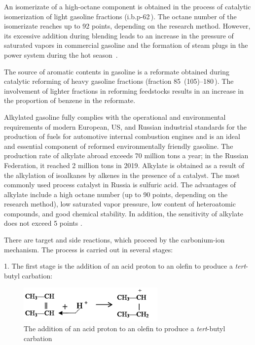 \documentclass{svproc}
\begin{document}
An isomerizate of a high-octane component is obtained in the process of catalytic isomerization of light gasoline fractions (i.b.p-62\,\textcelsius). The octane number of the isomerizate reaches up to 92 points, depending on the research method. However, its excessive addition during blending leads to an increase in the pressure of saturated vapors in commercial gasoline and the formation of steam plugs in the power system during the hot season~\cite{alkylation_mod}.

The source of aromatic contents in gasoline is a reformate obtained during catalytic reforming of heavy gasoline fractions (fraction 85~(105)--180\,\textcelsius). The involvement of lighter fractions in reforming feedstocks results in an increase in the proportion of benzene in the reformate.

Alkylated gasoline fully complies with the operational and environmental requirements of modern European, US, and Russian industrial standards for the production of fuels for automotive internal combustion engines and is an ideal and essential component of reformed environmentally friendly gasoline. The production rate of alkylate abroad exceeds 70 million tons a year; in the Russian Federation, it reached 2 million tons in 2019. Alkylate is obtained as a result of the alkylation of isoalkanes by alkenes in the presence of a catalyst. The most commonly used process catalyst in Russia is sulfuric acid. The advantages of alkylate include a high octane number (up to 90 points, depending on the research method), low saturated vapor pressure, low content of heteroatomic compounds, and good chemical stability. In addition, the sensitivity of alkylate does not exceed 5 points \cite{cao2019}.

There are target and side reactions, which proceed by the carbonium-ion mechanism. The process is carried out in several stages:

1. The first stage is the addition of an acid proton to an olefin to produce a \emph{tert}-butyl carbation:
\begin{figure}
\centering
\includegraphics[height=2.3 cm]{fig1.png}
\caption{The addition of an acid proton to an olefin to produce a \emph{tert}-butyl carbation}
\label{fig1}
\end{figure}
\end{document}
